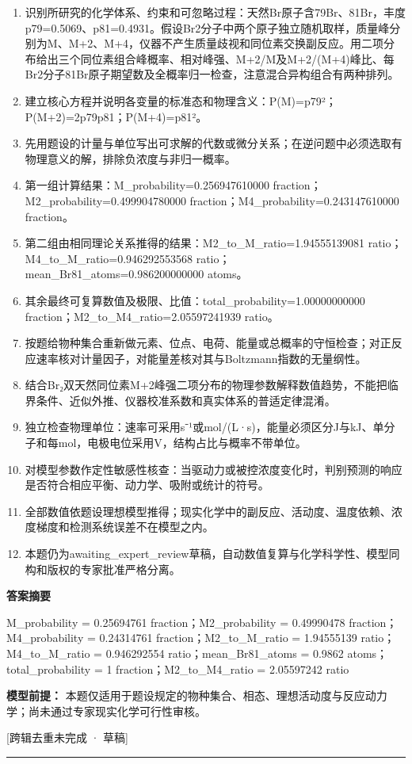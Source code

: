\documentclass[UTF8,11pt,a4paper]{ctexart}
\begin{document}
\begin{enumerate}
\item 识别所研究的化学体系、约束和可忽略过程：天然Br原子含79Br、81Br，丰度p79=0.5069、p81=0.4931。假设Br2分子中两个原子独立随机取样，质量峰分别为M、M+2、M+4，仪器不产生质量歧视和同位素交换副反应。用二项分布给出三个同位素组合峰概率、相对峰强、M+2/M及M+2/(M+4)峰比、每Br2分子81Br原子期望数及全概率归一检查，注意混合异构组合有两种排列。
\item 建立核心方程并说明各变量的标准态和物理含义：P(M)=p79²；P(M+2)=2p79p81；P(M+4)=p81²。
\item 先用题设的计量与单位写出可求解的代数或微分关系；在逆问题中必须选取有物理意义的解，排除负浓度与非归一概率。
\item 第一组计算结果：M\_probability=0.256947610000 fraction；M2\_probability=0.499904780000 fraction；M4\_probability=0.243147610000 fraction。
\item 第二组由相同理论关系推得的结果：M2\_to\_M\_ratio=1.94555139081 ratio；M4\_to\_M\_ratio=0.946292553568 ratio；mean\_Br81\_atoms=0.986200000000 atoms。
\item 其余最终可复算数值及极限、比值：total\_probability=1.00000000000 fraction；M2\_to\_M4\_ratio=2.05597241939 ratio。
\item 按题给物种集合重新做元素、位点、电荷、能量或总概率的守恒检查；对正反应速率核对计量因子，对能量差核对其与Boltzmann指数的无量纲性。
\item 结合Br₂双天然同位素M+2峰强二项分布的物理参数解释数值趋势，不能把临界条件、近似外推、仪器校准系数和真实体系的普适定律混淆。
\item 独立检查物理单位：速率可采用s⁻¹或mol/(L·s)，能量必须区分J与kJ、单分子和每mol，电极电位采用V，结构占比与概率不带单位。
\item 对模型参数作定性敏感性核查：当驱动力或被控浓度变化时，判别预测的响应是否符合相应平衡、动力学、吸附或统计的符号。
\item 全部数值依题设理想模型推得；现实化学中的副反应、活动度、温度依赖、浓度梯度和检测系统误差不在模型之内。
\item 本题仍为awaiting\_expert\_review草稿，自动数值复算与化学科学性、模型同构和版权的专家批准严格分离。
\end{enumerate}
\noindent\textbf{答案摘要}\par
M\_probability = 0.25694761 fraction；M2\_probability = 0.49990478 fraction；M4\_probability = 0.24314761 fraction；M2\_to\_M\_ratio = 1.94555139 ratio；M4\_to\_M\_ratio = 0.946292554 ratio；mean\_Br81\_atoms = 0.9862 atoms；total\_probability = 1 fraction；M2\_to\_M4\_ratio = 2.05597242 ratio\par
\noindent\textbf{模型前提：}
本题仅适用于题设规定的物种集合、相态、理想活动度与反应动力学；尚未通过专家现实化学可行性审核。\par
\noindent\textcolor{red!65!black}{[跨辑去重未完成 · 草稿]} \par
\medskip\hrule\medskip
{}
\end{document}
